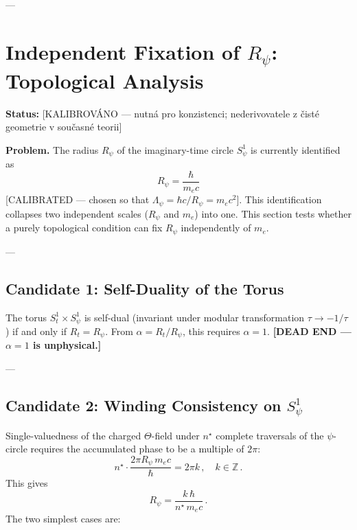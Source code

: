---


\section{Independent Fixation of $R_\psi$: Topological Analysis}
\label{sec:Rpsi_fixation}

\noindent\textbf{Status:} [KALIBROVÁNO — nutná pro konzistenci; nederivovatele z čisté
geometrie v současné teorii]

\noindent\textbf{Problem.}
The radius $R_\psi$ of the imaginary-time circle $S^1_\psi$ is currently identified as
\begin{equation}
  R_\psi = \frac{\hbar}{m_e c}
  \label{eq:Rpsi-current}
\end{equation}
[CALIBRATED — chosen so that $\Lambda_\psi = \hbar c/R_\psi = m_e c^2$].
This identification collapses two independent scales ($R_\psi$ and $m_e$) into one.
This section tests whether a purely topological condition can fix $R_\psi$
independently of $m_e$.

---

\subsection{Candidate 1: Self-Duality of the Torus}

The torus $S^1_t\times S^1_\psi$ is self-dual (invariant under modular transformation
$\tau\to-1/\tau$) if and only if $R_t = R_\psi$.  From $\alpha = R_t/R_\psi$, this
requires $\alpha=1$.  \textbf{[DEAD END — $\alpha=1$ is unphysical.]}

---

\subsection{Candidate 2: Winding Consistency on $S^1_\psi$}
\label{sec:winding-consistency}

Single-valuedness of the charged $\Theta$-field under $n^\star$ complete traversals
of the $\psi$-circle requires the accumulated phase to be a multiple of $2\pi$:
\begin{equation}
  n^\star \cdot \frac{2\pi R_\psi \, m_e c}{\hbar} = 2\pi k\,,\quad k\in\mathbb{Z}\,.
  \label{eq:winding-consistency}
\end{equation}
This gives
\begin{equation}
  R_\psi = \frac{k\,\hbar}{n^\star\, m_e c}\,.
  \label{eq:Rpsi-winding}
\end{equation}
The two simplest cases are:

